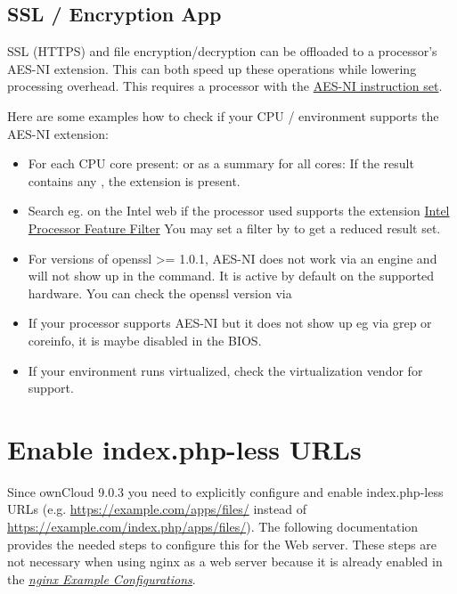\documentclass[letterpaper,10pt,english]{sphinxmanual}
\begin{document}
\subsection{SSL / Encryption App}
\label{configuration_server/oc_server_tuning:ssl-encryption-app}
SSL (HTTPS) and file encryption/decryption can be offloaded to a processor's
AES-NI extension. This can both speed up these operations while lowering
processing overhead. This requires a processor with the \href{http://wikipedia.org/wiki/AES\_instruction\_set}{AES-NI instruction set}.

Here are some examples how to check if your CPU / environment supports the
AES-NI extension:
\begin{itemize}
\item {} 
For each CPU core present:  or as a summary for
all cores:  If the result contains any
, the extension is present.

\item {} 
Search eg. on the Intel web if the processor used supports the extension
\href{http://ark.intel.com/MySearch.aspx?AESTech=true}{Intel Processor Feature Filter} You may set a filter by
 to get a reduced result set.

\item {} 
For versions of openssl \textgreater{}= 1.0.1, AES-NI does not work via an engine and
will not show up in the  command. It is active by default
on the supported hardware. You can check the openssl version via 

\item {} 
If your processor supports AES-NI but it does not show up eg via grep or
coreinfo, it is maybe disabled in the BIOS.

\item {} 
If your environment runs virtualized, check the virtualization vendor for
support.

\end{itemize}


\section{Enable index.php-less URLs}
\label{configuration_server/index_php_less_urls::doc}\label{configuration_server/index_php_less_urls:enable-index-php-less-urls}
Since ownCloud 9.0.3 you need to explicitly configure and enable index.php-less URLs
(e.g. \href{https://example.com/apps/files/}{https://example.com/apps/files/} instead of \href{https://example.com/index.php/apps/files/}{https://example.com/index.php/apps/files/}).
The following documentation provides the needed steps to configure this for the 
Web server. These steps are not necessary when using nginx as a web server because it is already
enabled in the {\hyperref[installation/nginx_examples::doc]{\emph{\emph{nginx Example Configurations}}}}.
\end{document}
